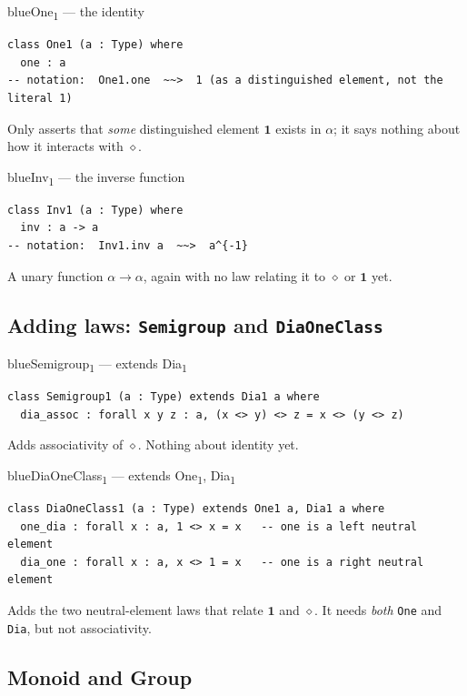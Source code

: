 \documentclass[11pt]{article}
\begin{document}
\begin{defbox}{blue}{One\textsubscript{1} --- the identity}
\begin{lstlisting}
class One1 (a : Type) where
  one : a
-- notation:  One1.one  ~~>  1 (as a distinguished element, not the literal 1)
\end{lstlisting}
Only asserts that \emph{some} distinguished element $\mathbf{1}$ exists in $\alpha$; it says nothing about how it interacts with $\diamond$.
\end{defbox}

\begin{defbox}{blue}{Inv\textsubscript{1} --- the inverse function}
\begin{lstlisting}
class Inv1 (a : Type) where
  inv : a -> a
-- notation:  Inv1.inv a  ~~>  a^{-1}
\end{lstlisting}
A unary function $\alpha \to \alpha$, again with no law relating it to $\diamond$ or $\mathbf{1}$ yet.
\end{defbox}

\subsection{Adding laws: \texttt{Semigroup} and \texttt{DiaOneClass}}

\begin{defbox}{blue}{Semigroup\textsubscript{1} --- extends Dia\textsubscript{1}}
\begin{lstlisting}
class Semigroup1 (a : Type) extends Dia1 a where
  dia_assoc : forall x y z : a, (x <> y) <> z = x <> (y <> z)
\end{lstlisting}
Adds associativity of $\diamond$. Nothing about identity yet.
\end{defbox}

\begin{defbox}{blue}{DiaOneClass\textsubscript{1} --- extends One\textsubscript{1}, Dia\textsubscript{1}}
\begin{lstlisting}
class DiaOneClass1 (a : Type) extends One1 a, Dia1 a where
  one_dia : forall x : a, 1 <> x = x   -- one is a left neutral element
  dia_one : forall x : a, x <> 1 = x   -- one is a right neutral element
\end{lstlisting}
Adds the two neutral-element laws that relate $\mathbf{1}$ and $\diamond$. It needs \emph{both} \texttt{One} and \texttt{Dia}, but not associativity.
\end{defbox}

\subsection{Monoid and Group}
\end{document}
